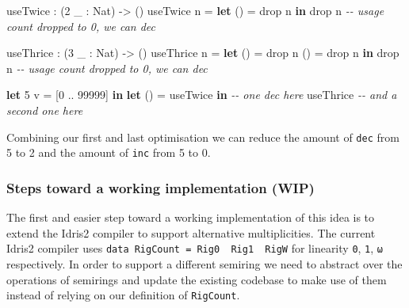 \documentclass[
]{article}
\newenvironment{Shaded}{}{}
\newcommand{\CommentTok}[1]{\textcolor[rgb]{0.38,0.63,0.69}{\textit{#1}}}
\newcommand{\DataTypeTok}[1]{\textcolor[rgb]{0.56,0.13,0.00}{#1}}
\newcommand{\DecValTok}[1]{\textcolor[rgb]{0.25,0.63,0.44}{#1}}
\newcommand{\FunctionTok}[1]{\textcolor[rgb]{0.02,0.16,0.49}{#1}}
\newcommand{\KeywordTok}[1]{\textcolor[rgb]{0.00,0.44,0.13}{\textbf{#1}}}
\newcommand{\NormalTok}[1]{#1}
\newcommand{\OperatorTok}[1]{\textcolor[rgb]{0.40,0.40,0.40}{#1}}
\newcommand{\OtherTok}[1]{\textcolor[rgb]{0.00,0.44,0.13}{#1}}
\begin{document}
\begin{Shaded}
\begin{Highlighting}[]
\NormalTok{useTwice }\OperatorTok{:}\NormalTok{ (}\DecValTok{2}\NormalTok{ \_ }\OperatorTok{:} \DataTypeTok{Nat}\NormalTok{) }\OtherTok{{-}\textgreater{}}\NormalTok{ ()}
\NormalTok{useTwice n }\OtherTok{=} \KeywordTok{let}\NormalTok{ () }\OtherTok{=} \FunctionTok{drop}\NormalTok{ n }\KeywordTok{in}
                 \FunctionTok{drop}\NormalTok{ n }\CommentTok{{-}{-} usage count dropped to 0, we can \textasciigrave{}dec\textasciigrave{}}

\NormalTok{useThrice }\OperatorTok{:}\NormalTok{ (}\DecValTok{3}\NormalTok{ \_ }\OperatorTok{:} \DataTypeTok{Nat}\NormalTok{) }\OtherTok{{-}\textgreater{}}\NormalTok{ ()}
\NormalTok{useThrice n }\OtherTok{=} \KeywordTok{let}\NormalTok{ () }\OtherTok{=} \FunctionTok{drop}\NormalTok{ n }
\NormalTok{                  () }\OtherTok{=} \FunctionTok{drop}\NormalTok{ n}
               \KeywordTok{in} \FunctionTok{drop}\NormalTok{ n }\CommentTok{{-}{-} usage count dropped to 0, we can \textasciigrave{}dec\textasciigrave{}}

\KeywordTok{let} \DecValTok{5}\NormalTok{ v }\OtherTok{=}\NormalTok{ [}\DecValTok{0} \OperatorTok{..} \DecValTok{99999}\NormalTok{] }\KeywordTok{in}
\KeywordTok{let}\NormalTok{ () }\OtherTok{=}\NormalTok{ useTwice }\KeywordTok{in} \CommentTok{{-}{-} one \textasciigrave{}dec\textasciigrave{} here}
\NormalTok{    useThrice }\CommentTok{{-}{-} and a second one here}
\end{Highlighting}
\end{Shaded}

Combining our first and last optimisation we can reduce the amount of
\texttt{dec} from 5 to 2 and the amount of \texttt{inc} from 5 to 0.

\hypertarget{steps-toward-a-working-implementation-wip}{%
\subsubsection{Steps toward a working implementation
(WIP)}\label{steps-toward-a-working-implementation-wip}}

The first and easier step toward a working implementation of this idea
is to extend the Idris2 compiler to support alternative multiplicities.
The current Idris2 compiler uses
\texttt{data\ RigCount\ =\ Rig0\ \textbar{}\ Rig1\ \textbar{}\ RigW} for
linearity \texttt{0}, \texttt{1}, \texttt{ω} respectively. In order to
support a different semiring we need to abstract over the operations of
semirings and update the existing codebase to make use of them instead
of relying on our definition of \texttt{RigCount}.
\end{document}
